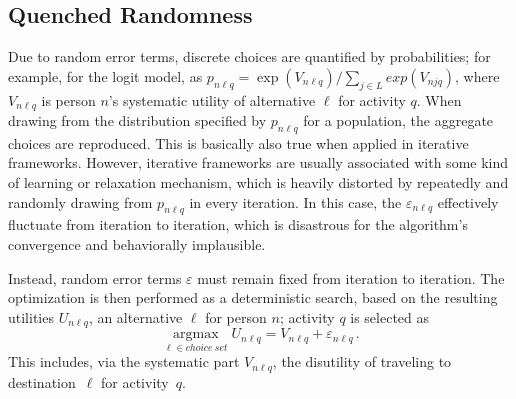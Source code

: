 \subsection{Quenched Randomness}
Due to random error terms, discrete choices are quantified by probabilities; for example, for the logit model, as $p_{n\ell q} = \exp(V_{n\ell q}) / \sum_{j \in L} exp(V_{njq})$, where $V_{n\ell q}$ is person $n$'s systematic utility of alternative $\ell$ for activity $q$. 
When drawing from the distribution specified by $p_{n\ell 
  q}$ for a population, the aggregate choices are reproduced. 
This is basically also true when applied in iterative frameworks. 
However, iterative frameworks are usually associated with some kind of learning or relaxation mechanism, which 
is heavily distorted by repeatedly and randomly drawing from $p_{n\ell q}$ in every iteration. 
In this case, the $\varepsilon_{n\ell q}$ effectively fluctuate from iteration to iteration, which is disastrous for the algorithm's convergence and behaviorally implausible.

Instead, random error terms $\varepsilon$ must remain fixed from iteration to iteration. 
The optimization is then performed as a deterministic search, based on the resulting utilities $U_{n\ell q}$, \ie an alternative $\ell$ for person $n$; activity $q$ is selected as 
\[ 
\underset{\ell \in choice\: set}{\operatorname{argmax}} U_{n \ell q} = V_{n \ell q} + \varepsilon_{n \ell q} \,.
\] 
This includes, via the systematic part $V_{n\ell q}$, the disutility of traveling to destination~$\ell$ for activity~$q$.

